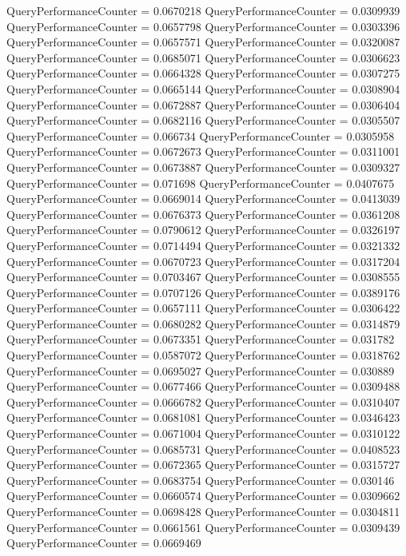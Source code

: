 \documentclass[9pt]{article}
\theoremstyle{plain}
\theoremstyle{definition}
\theoremstyle{remark}
\numberwithin{equation}{section}
\begin{document}
QueryPerformanceCounter  =  0.0670218
QueryPerformanceCounter  =  0.0309939
QueryPerformanceCounter  =  0.0657798
QueryPerformanceCounter  =  0.0303396
QueryPerformanceCounter  =  0.0657571
QueryPerformanceCounter  =  0.0320087
QueryPerformanceCounter  =  0.0685071
QueryPerformanceCounter  =  0.0306623
QueryPerformanceCounter  =  0.0664328
QueryPerformanceCounter  =  0.0307275
QueryPerformanceCounter  =  0.0665144
QueryPerformanceCounter  =  0.0308904
QueryPerformanceCounter  =  0.0672887
QueryPerformanceCounter  =  0.0306404
QueryPerformanceCounter  =  0.0682116
QueryPerformanceCounter  =  0.0305507
QueryPerformanceCounter  =  0.066734
QueryPerformanceCounter  =  0.0305958
QueryPerformanceCounter  =  0.0672673
QueryPerformanceCounter  =  0.0311001
QueryPerformanceCounter  =  0.0673887
QueryPerformanceCounter  =  0.0309327
QueryPerformanceCounter  =  0.071698
QueryPerformanceCounter  =  0.0407675
QueryPerformanceCounter  =  0.0669014
QueryPerformanceCounter  =  0.0413039
QueryPerformanceCounter  =  0.0676373
QueryPerformanceCounter  =  0.0361208
QueryPerformanceCounter  =  0.0790612
QueryPerformanceCounter  =  0.0326197
QueryPerformanceCounter  =  0.0714494
QueryPerformanceCounter  =  0.0321332
QueryPerformanceCounter  =  0.0670723
QueryPerformanceCounter  =  0.0317204
QueryPerformanceCounter  =  0.0703467
QueryPerformanceCounter  =  0.0308555
QueryPerformanceCounter  =  0.0707126
QueryPerformanceCounter  =  0.0389176
QueryPerformanceCounter  =  0.0657111
QueryPerformanceCounter  =  0.0306422
QueryPerformanceCounter  =  0.0680282
QueryPerformanceCounter  =  0.0314879
QueryPerformanceCounter  =  0.0673351
QueryPerformanceCounter  =  0.031782
QueryPerformanceCounter  =  0.0587072
QueryPerformanceCounter  =  0.0318762
QueryPerformanceCounter  =  0.0695027
QueryPerformanceCounter  =  0.030889
QueryPerformanceCounter  =  0.0677466
QueryPerformanceCounter  =  0.0309488
QueryPerformanceCounter  =  0.0666782
QueryPerformanceCounter  =  0.0310407
QueryPerformanceCounter  =  0.0681081
QueryPerformanceCounter  =  0.0346423
QueryPerformanceCounter  =  0.0671004
QueryPerformanceCounter  =  0.0310122
QueryPerformanceCounter  =  0.0685731
QueryPerformanceCounter  =  0.0408523
QueryPerformanceCounter  =  0.0672365
QueryPerformanceCounter  =  0.0315727
QueryPerformanceCounter  =  0.0683754
QueryPerformanceCounter  =  0.030146
QueryPerformanceCounter  =  0.0660574
QueryPerformanceCounter  =  0.0309662
QueryPerformanceCounter  =  0.0698428
QueryPerformanceCounter  =  0.0304811
QueryPerformanceCounter  =  0.0661561
QueryPerformanceCounter  =  0.0309439
QueryPerformanceCounter  =  0.0669469
\end{document}
